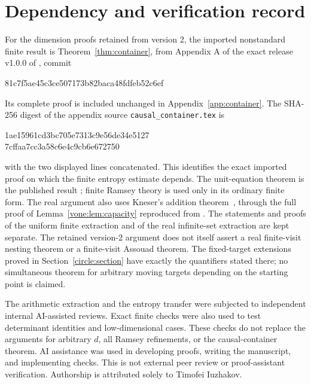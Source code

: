 \documentclass[11pt]{article}
\theoremstyle{definition}
\theoremstyle{remark}
\begin{document}
\section*{Dependency and verification record}
For the dimension proofs retained from version 2, the imported nonstandard finite result is
Theorem~\ref{thm:container}, from Appendix A of the exact release
v1.0.0 of \cite{Core}, commit
\begin{center}\small\ttfamily
81c7f5ae45c3ce507173b82baca48fdfeb52c6ef
\end{center}
Its complete proof is included unchanged in Appendix~\ref{app:container}.
The SHA-256 digest of the appendix source
\texttt{causal\_container.tex} is
\begin{center}\small\ttfamily
1ae15961cd3bc705e7313c9e56de34e5127\\
7cffaa7cc3a58c6e4c9cb6e672750
\end{center}
with the two displayed lines concatenated. This identifies the exact
imported proof on which the finite entropy estimate depends. The
unit-equation theorem is the published result \cite{ESS}; finite
Ramsey theory is used only in its ordinary finite form. The real argument
also uses Kneser's addition theorem~\cite{DeVos}, through the full proof
of Lemma~\ref{vone:lem:capacity} reproduced from
\cite[Lemma~2.1]{Core}. The statements and proofs of the uniform finite
extraction and of the real infinite-set extraction are kept separate.
The retained version-2 argument does not itself assert a real finite-visit
nesting theorem or a finite-visit Assouad theorem. The fixed-target
extensions proved in Section~\ref{circle:section} have exactly the
quantifiers stated there; no simultaneous theorem for arbitrary moving
targets depending on the starting point is claimed.

The arithmetic extraction and the entropy transfer were subjected to
independent internal AI-assisted reviews. Exact finite checks were
also used to test determinant identities and low-dimensional cases.
These checks do not replace the arguments for arbitrary $d$, all
Ramsey refinements, or the causal-container theorem.
AI assistance was used in developing proofs, writing the manuscript,
and implementing checks. This is not external peer review or
proof-assistant verification. Authorship is attributed solely to
Timofei Iuzhakov.
\end{document}
